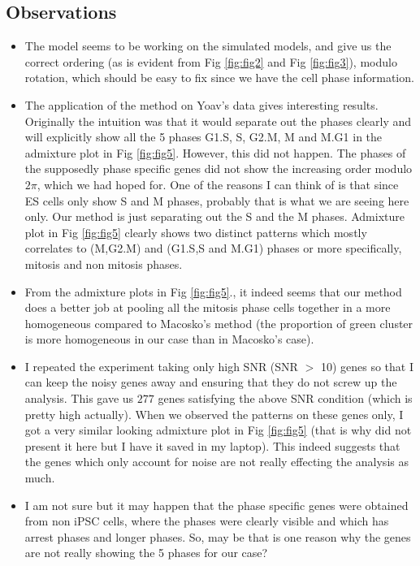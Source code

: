 \documentclass[11pt]{article}
\begin{document}
\subsection{Observations}

\begin{itemize}
\item The model seems to be working on the simulated models, and give us the correct ordering (as is evident from Fig \ref{fig:fig2} and Fig \ref{fig:fig3}), modulo rotation, which should be easy to fix since we have the cell phase information.

\item The application of the method on Yoav's data gives interesting results. Originally the intuition was that it would separate out the phases clearly and will explicitly show all the 5 phases G1.S, S, G2.M, M and M.G1 in the admixture plot in Fig \ref{fig:fig5}. However, this did not happen. The phases of the supposedly phase specific genes did not show the increasing order modulo $2 \pi$, which we had hoped for. One of the reasons I can think of is that since ES cells only show S and M phases, probably that is what we are seeing here only. Our method is just separating out the S and the M phases. Admixture plot in Fig \ref{fig:fig5} clearly shows two distinct patterns which mostly correlates to (M,G2.M) and (G1.S,S and M.G1) phases or more specifically, mitosis and non mitosis phases.

\item From the admixture plots in Fig \ref{fig:fig5}., it indeed seems that our method does a better job at pooling all the mitosis phase cells together in a more homogeneous compared to Macosko's method (the proportion of green cluster is more homogeneous in our case than in Macosko's case).

\item I repeated the experiment taking only high SNR (SNR $>$ 10) genes so that I can keep the noisy genes away and ensuring that they do not screw up the analysis. This gave us $277$ genes satisfying the above SNR condition (which is pretty high actually). When we observed the patterns on these genes only, I got a very similar looking admixture plot in Fig \ref{fig:fig5} (that is why did not present it here but I have it saved in my laptop). This indeed suggests that the genes which only account for noise are not really effecting the analysis as much.

\item I am not sure but it may happen that the phase specific genes were obtained from non iPSC cells, where the phases were clearly visible and which has arrest phases and longer phases. So, may be that is one reason why the genes are not really showing the 5 phases for our case?

\end{itemize}
\end{document}
